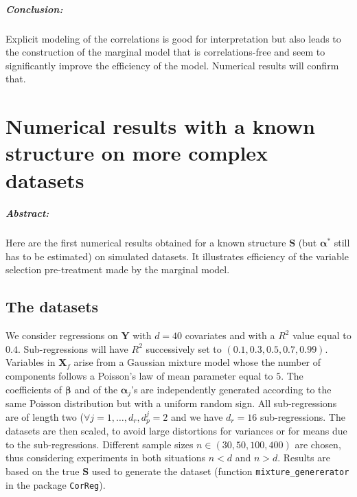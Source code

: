 \documentclass[12pt,a4paper]{report}
\begin{document}
		\paragraph{Conclusion:} Explicit modeling of the correlations is good for interpretation but also leads to the construction of the marginal model that is correlations-free and seem to significantly improve the efficiency of the model. Numerical results will confirm that.
		
\chapter{Numerical results with a known structure on more complex datasets}	\label{chaptersimulexpl}
\paragraph{Abstract:} Here are the first numerical results obtained for a known structure $\boldsymbol{S}$ (but $\boldsymbol{\alpha}^* $ still has to be estimated) on simulated datasets. It illustrates efficiency of the variable selection pre-treatment made by the marginal model.
		 
	
	\section{The datasets}\label{thedatasets}
		
We consider regressions on $\boldsymbol{Y}$ with $d=40$ covariates and with a $R^2$ value equal to $0.4$. Sub-regressions will have $R^2$ successively set to $(0.1,0.3,0.5,0.7,0.99)$. Variables in $\boldsymbol{X}_f$ arise from a Gaussian mixture model whose the number of components follows a Poisson's law of mean parameter equal to $5$. The coefficients of $\boldsymbol{\beta}$ and of the $\boldsymbol{\alpha}_j$'s are independently generated according to the same Poisson distribution but with a uniform random sign. All sub-regressions are of length two ($\forall j=1,\ldots,d_r, d_p^j=2$ and we have $d_r=16$ sub-regressions. The datasets are then scaled, to avoid large distortions for variances or for means due to the sub-regressions.	Different sample sizes  $n\in (30,50,100,400)$ are chosen, thus considering experiments in both situations $n<d$ and $n>d$. 
	Results are based on the true $\boldsymbol{S}$ used to generate the dataset (function {\tt mixture\_genererator} in the package {\tt CorReg}).\\
	
\end{document}
